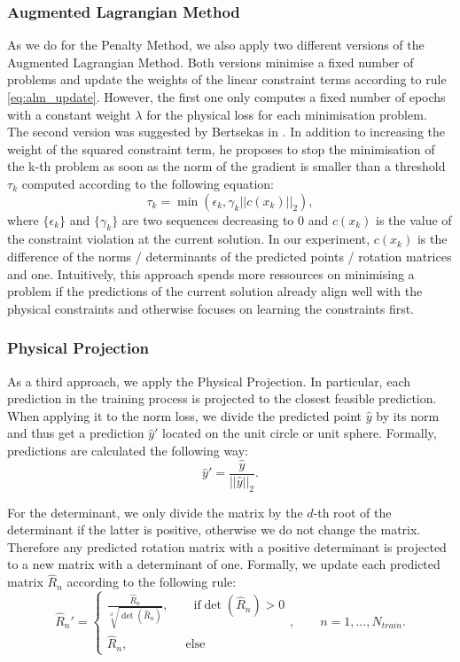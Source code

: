 \subsubsection{Augmented Lagrangian Method}
\label{exp:alm}
As we do for the Penalty Method, we also apply two different versions of the Augmented Lagrangian Method. Both versions minimise a fixed number of problems and update the weights of the linear constraint terms according to rule \eqref{eq:alm_update}. However, the first one only computes a fixed number of epochs with a constant weight $\lambda$ for the physical loss for each minimisation problem.\\
\indent The second version was suggested by Bertsekas in \cite{Yurkiewicz1985ConstrainedOA}. In addition to increasing the weight of the squared constraint term, he proposes to stop the minimisation of the k-th problem as soon as the norm of the gradient is smaller than a threshold $\tau_k$ computed according to the following equation:
\[\tau_k = \min(\epsilon_k, \gamma_k ||c(x_k)||_2), \]
where $\{\epsilon_k\}$ and $\{\gamma_k \}$ are two sequences decreasing to 0 and $c(x_k)$ is the value of the constraint violation at the current solution. In our experiment, $c(x_k)$ is the difference of the norms / determinants of the predicted points / rotation matrices and one. Intuitively, this approach spends more ressources on minimising a problem if the predictions of the current solution already align well with the physical constraints and otherwise focuses on learning the constraints first.

\subsubsection{Physical Projection}
\label{sec:phys_proj}
As a third approach, we apply the Physical Projection. In particular, each prediction in the training process is projected to the closest feasible prediction. When applying it to the norm loss, we divide the predicted point $\hat{y}$ by its norm and thus get a prediction $\hat{y}'$ located on the unit circle or unit sphere. Formally, predictions are calculated the following way:
\begin{equation}
\hat{y}' = \frac{\hat{y}}{||\hat{y}||_2}.
\end{equation}

For the determinant, we only divide the matrix by the $d$-th root of the determinant if the latter is positive, otherwise we do not change the matrix. Therefore any predicted rotation matrix with a positive determinant is projected to a new matrix with a determinant of one. Formally, we update each predicted matrix $\hat{R}_n$ according to the following rule:
\begin{equation}
\hat{R}_n' = \begin{cases} \frac{\hat{R}_n}{\sqrt[d]{\det(\hat{R}_n)}}, \qquad \text{if} \det(\hat{R}_n) > 0 \\ \hat{R}_n, \qquad \qquad \,\,\,\,\text{else} \end{cases}, \qquad n = 1, ..., N_{train}.
\label{eq:norm_det}
\end{equation}

